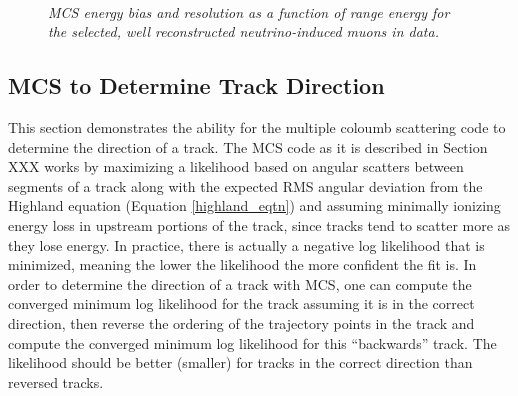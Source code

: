 \begin{figure}
\centering
\mbox{
	\quad
	}
\caption{\textit{MCS energy bias and resolution as a function of range energy for the selected, well reconstructed neutrino-induced muons in {\ub} data.}}
\label{seglenstudy_bias_resolution_DataRecoTrack_fig}
\end{figure}





\subsection{MCS to Determine Track Direction}\label{TrackDirection_DataRecoTrack_section}
This section demonstrates the ability for the multiple coloumb scattering code to determine the direction of a track. The MCS code as it is described in Section XXX works by maximizing a likelihood based on angular scatters between segments of a track along with the expected RMS angular deviation from the Highland equation (Equation \ref{highland_eqtn}) and assuming minimally ionizing energy loss in upstream portions of the track, since tracks tend to scatter more as they lose energy. In practice, there is actually a negative log likelihood that is minimized, meaning the lower the likelihood the more confident the fit is. In order to determine the direction of a track with MCS, one can compute the converged minimum log likelihood for the track assuming it is in the correct direction, then reverse the ordering of the trajectory points in the track and compute the converged minimum log likelihood for this ``backwards'' track. The likelihood should be better (smaller) for tracks in the correct direction than reversed tracks.\\

